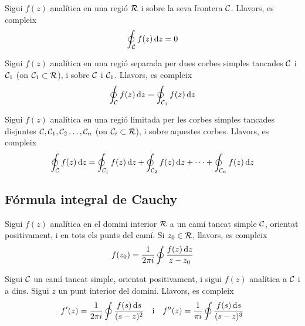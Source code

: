 \begin{thm}[de Cauchy]
    Sigui $f(z)$ analítica en una regió $\mathcal{R}$ i sobre la seva frontera $\mathcal{C}$. Llavors, es compleix
    \begin{align}
        \oint_{\mathcal{C}} f(z) \mathop{}\!\mathrm{d} z = 0
    \end{align}
\end{thm}

\begin{thm}
    Sigui $f(z)$ analítica en una regió separada per dues corbes simples tancades $\mathcal{C}$ i $\mathcal{C}_{1}$ (on $\mathcal{C}_{1} \subset \mathcal{R}$), i sobre $\mathcal{C}$ i $\mathcal{C}_{1}$. Llavors, es compleix
    \begin{align}
        \oint_{\mathcal{C}} f(z) \mathop{}\!\mathrm{d} z = \oint_{\mathcal{C}_{1}} f(z) \mathop{}\!\mathrm{d} z
    \end{align}
\end{thm}

\begin{thm}
    Sigui $f(z)$ analítica en una regió limitada per les corbes simples tancades disjuntes $\mathcal{C}, \mathcal{C}_{1}, \mathcal{C}_{2} \dots , \mathcal{C}_{n}$ (on $\mathcal{C}_{i} \subset \mathcal{R}$), i sobre aquestes corbes. Llavors, es compleix
    \begin{align}
        \oint_{\mathcal{C}} f(z) \mathop{}\!\mathrm{d} z = \oint_{\mathcal{C}_{1}} f(z) \mathop{}\!\mathrm{d} z + \oint_{\mathcal{C}_{2}} f(z) \mathop{}\!\mathrm{d} z + \dots + \oint_{\mathcal{C}_{n}} f(z) \mathop{}\!\mathrm{d} z
    \end{align}
\end{thm}

\subsection{Fórmula integral de Cauchy}
\begin{thm}
    Sigui $f(z)$ analítica en el domini interior $\mathcal{R}$ a un camí tancat simple $\mathcal{C}$, orientat positivament, i en tots els punts del camí. Si $z_{0} \in \mathcal{R}$, llavors, es compleix
    \begin{align}
        f(z_{0}) = \frac{1}{2 \pi i} \oint \frac{f(z) \mathop{}\!\mathrm{d} z}{z-z_{0}}
    \end{align}
\end{thm}

\begin{lem}
    Sigui $\mathcal{C}$ un camí tancat simple, orientat positivament, i sigui $f(z)$ analítica a $\mathcal{C}$ i a dins. Sigui $z$ un punt interior del domini. Llavors, es compleix
    \begin{align*}
        f'(z) = \frac{1}{2 \pi i} \oint \frac{f(s) \mathop{}\!\mathrm{d} s}{(s-z)^{2}} \quad \text{i} \quad f''(z) = \frac{1}{\pi i} \oint \frac{f(s) \mathop{}\!\mathrm{d} s}{(s-z)^{3}}
    \end{align*}
\end{lem}

